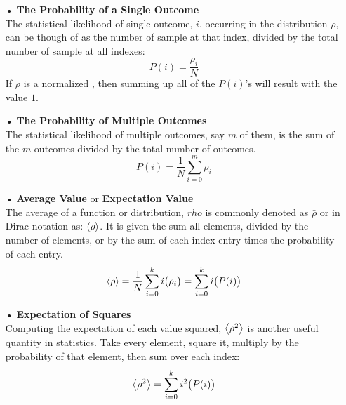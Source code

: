 \documentclass[12pt,letterpaper]{book}
\begin{document}
\begin{enumerate}

\item[•]\textbf{The Probability of a Single Outcome}\\
The statistical likelihood of single outcome, $i$, occurring in the distribution $\rho$, can be though of as the number of sample at that index, divided by the total number of sample at all indexes:
\begin{equation}
\label{disc prob}
P(i) = \frac{\rho_i}{N}
\end{equation}
If $\rho$ is a normalized , then summing up all of the $P(i)$'s will result with the value $1$.

\item[•]\textbf{The Probability of Multiple Outcomes}\\
The statistical likelihood of multiple outcomes, say $m$ of them, is the sum of the $m$ outcomes divided by the total number of outcomes.
\begin{equation}
\label{disc multi prob}
P(i) = \frac{1}{N} \sum_{i=0}^{m}\rho_i
\end{equation}

\item[•]\textbf{Average Value} or \textbf{Expectation Value}\\
The average of a function or distribution, $rho$ is commonly denoted as $\bar{\rho}$ or in Dirac notation as: $\expval{\rho}$. It is given the sum all elements, divided by the number of elements, or by the sum of each index entry times the probability of each entry.
\begin{equation}
\label{expect val}
\expval{\rho} = \frac{1}{N} \sum_{i=0}^{k} i\big(\rho_i\big) = \sum_{i=0}^{k} i \big(P(i)\big)
\end{equation}

\item[•]\textbf{Expectation of Squares}\\
Computing the expectation of each value squared, $\expval{\rho^2}$ is another useful quantity in statistics. Take every element, square it,  multiply by the probability of that element, then sum over each index:
\begin{equation}
\label{expect val sq}
\expval{\rho^2} = \sum_{i=0}^{k} i^2 \big( P(i) \big)
\end{equation}
\end{enumerate}
\end{document}
